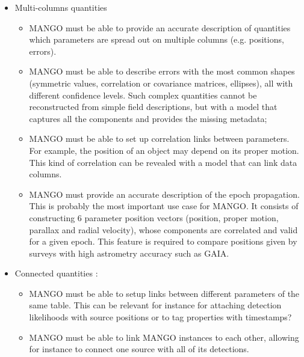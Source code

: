 \documentclass[11pt,a4paper]{ivoa}
\begin{document}
\begin{itemize}
    \item Multi-columns quantities
       \begin{itemize}[noitemsep,topsep=0pt,parsep=0pt,partopsep=0pt]
          \item MANGO must be able to provide an accurate description of quantities which parameters are spread 
                out on multiple columns (e.g. positions, errors).
          \item MANGO must be able to describe errors with the most common shapes (symmetric values, correlation 
                or covariance matrices, ellipses), all with different confidence levels. 
                Such complex quantities cannot be reconstructed from simple field descriptions, but with a model
                that captures all the components and provides the missing metadata;
          \item MANGO must be able to set up correlation links between parameters. For example,
                the position of an object may depend on its proper motion. This kind of correlation can be revealed 
                with a model that can link data columns.
          \item MANGO must provide an accurate description of the epoch propagation. 
                This is probably the most important use case for MANGO. It consists of constructing 6 parameter          
                position vectors (position, proper motion, parallax and radial velocity), whose components are correlated and 
                valid for a given epoch. 
                This feature is required to compare positions given by surveys with high astrometry accuracy  such as GAIA.
       \end{itemize} 
         
    \item Connected quantities : 
       \begin{itemize}[noitemsep,topsep=0pt,parsep=0pt,partopsep=0pt]
           \item MANGO must be able to setup links between different parameters of the same table. 
                 This can be relevant for instance for attaching detection likelihoods with source positions
                 or to tag properties with timestamps?
           \item MANGO must be able to link MANGO instances to each other, allowing for instance to connect one 
                 source with all of its detections.
        \end{itemize}   
\end{itemize}
\end{document}
